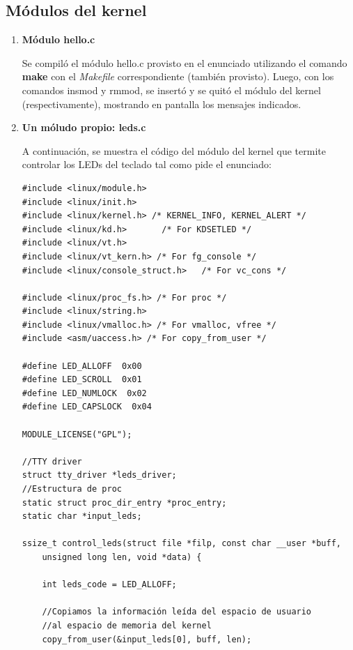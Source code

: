 \documentclass[a4paper,11pt] {article}
\begin{document}
\begin{enumerate}
\begin{enumerate}
		\end{enumerate}

\end{enumerate}

\subsection*{Módulos del kernel}

\begin{enumerate}
	\item \textbf{Módulo hello.c}

	Se compiló el módulo hello.c provisto en el enunciado utilizando el comando \textbf{make} con el \textit{Makefile} correspondiente (también provisto). Luego, con los comandos insmod y rmmod, se insertó y se quitó el módulo del kernel (respectivamente), mostrando en pantalla los mensajes indicados.

	\item \textbf{Un móludo propio: leds.c}

	A continuación, se muestra el código del módulo del kernel que termite controlar los LEDs del teclado tal como pide el enunciado:

	\begin{verbatim}
#include <linux/module.h>
#include <linux/init.h>
#include <linux/kernel.h> /* KERNEL_INFO, KERNEL_ALERT */
#include <linux/kd.h>		/* For KDSETLED */
#include <linux/vt.h>
#include <linux/vt_kern.h> /* For fg_console */
#include <linux/console_struct.h>	/* For vc_cons */

#include <linux/proc_fs.h> /* For proc */
#include <linux/string.h>
#include <linux/vmalloc.h> /* For vmalloc, vfree */
#include <asm/uaccess.h> /* For copy_from_user */

#define LED_ALLOFF  0x00
#define LED_SCROLL  0x01
#define LED_NUMLOCK  0x02
#define LED_CAPSLOCK  0x04

MODULE_LICENSE("GPL");

//TTY driver
struct tty_driver *leds_driver;
//Estructura de proc
static struct proc_dir_entry *proc_entry;
static char *input_leds;

ssize_t control_leds(struct file *filp, const char __user *buff, 
    unsigned long len, void *data) {

    int leds_code = LED_ALLOFF;
    
    //Copiamos la información leída del espacio de usuario
    //al espacio de memoria del kernel
    copy_from_user(&input_leds[0], buff, len);
    

\end{verbatim}
\end{enumerate}
\end{document}
